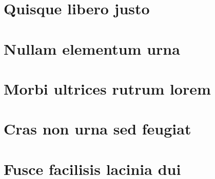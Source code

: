 \begin{apendicesenv}

\partapendices

\chapter{Quisque libero justo}

\lipsum[50]

\chapter{Nullam elementum urna}
\lipsum[55-57]

\end{apendicesenv}



\begin{anexosenv}

\partanexos

\chapter{Morbi ultrices rutrum lorem}
\lipsum[30]

\chapter{Cras non urna sed feugiat}

\lipsum[31]

\chapter{Fusce facilisis lacinia dui}

\lipsum[32]

\end{anexosenv}

\printindex
